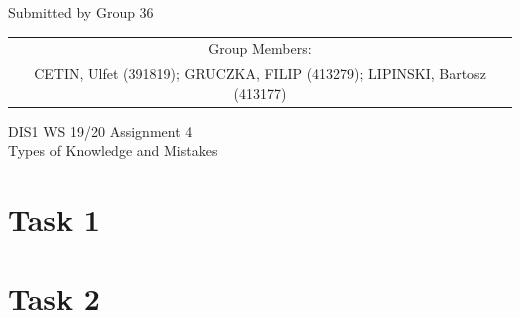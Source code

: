 \documentclass[a4paper,11pt,oneside]{scrreprt}
\begin{document}
\begin{center}
	Submitted by Group 36
	
	\bigskip
	
	\begin{tabular}{c}
	Group Members: \\
	CETIN, Ulfet (391819); GRUCZKA, FILIP (413279);	LIPINSKI, Bartosz (413177) \\
	\end{tabular}

	\bigskip
	
	DIS1 WS 19/20 Assignment 4\\
	Types of Knowledge and Mistakes
	
\end{center}

\section*{Task 1}



\vspace{5cm}

\bigskip

\bigskip

\bigskip

\begin{figure}[H]
	\centering 
	
\end{figure}


\clearpage
\section*{Task 2}
\end{document}
